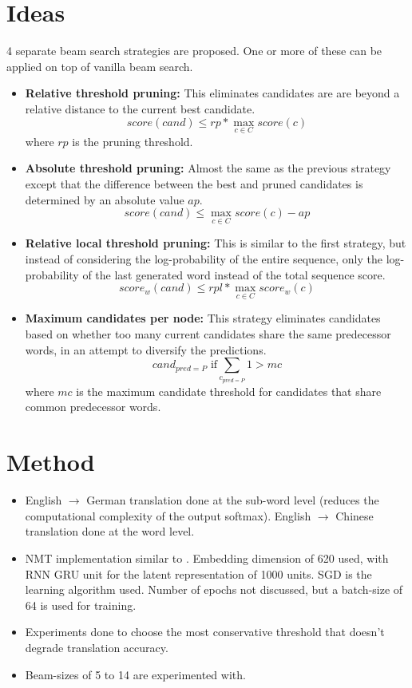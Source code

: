 \documentclass[12pt]{scrartcl}
\begin{document}
\section{Ideas}
  4 separate beam search strategies are proposed. One or more of these can be applied on top of vanilla beam search.
  \begin{itemize}
    \item \textbf{Relative threshold pruning:} This eliminates candidates are are beyond a relative distance to the current best candidate.
    $$score(cand) \leq rp * \max_{c \in C} {score(c)}$$
    where $rp$ is the pruning threshold.
    \item \textbf{Absolute threshold pruning:} Almost the same as the previous strategy except that the difference between the best and pruned candidates is determined by an absolute value $ap$.
    $$score(cand) \leq \max_{c \in C} {score(c)} - ap$$
    \item \textbf{Relative local threshold pruning:} This is similar to the first strategy, but instead of considering the log-probability of the entire sequence, only the log-probability of the last generated word instead of the total sequence score.
    $$score_w(cand) \leq rpl * \max_{c \in C} {score_w(c)}$$
    \item \textbf{Maximum candidates per node:} This strategy eliminates candidates based on whether too many current candidates share the same predecessor words, in an attempt to diversify the predictions.
    $$cand_{pred = P} \text{ if} \sum_{c_{pred = P}} 1 > mc$$
    where $mc$ is the maximum candidate threshold for candidates that share common predecessor words.
  \end{itemize}

\section{Method}
  \begin{itemize}
    \item English $\rightarrow$ German translation done at the sub-word level (reduces the computational complexity of the output softmax). English $\rightarrow$ Chinese translation done at the word level.
    \item NMT implementation similar to \cite{bahdanau2014neural}. Embedding dimension of 620 used, with RNN GRU unit for the latent representation of 1000 units. SGD is the learning algorithm used. Number of epochs not discussed, but a batch-size of 64 is used for training.
    \item Experiments done to choose the most conservative threshold that doesn't degrade translation accuracy. 
    \item Beam-sizes of 5 to 14 are experimented with.
  \end{itemize}
\end{document}
